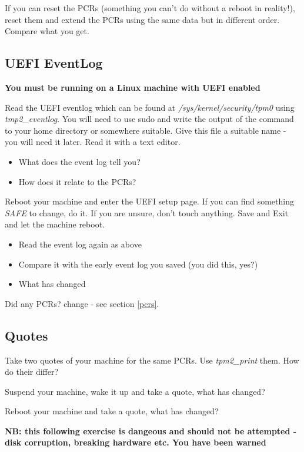 \documentclass[11pt,a4paper]{article}
\begin{document}
If you can reset the PCRs (something you can't do without a reboot in reality!), reset them and extend the PCRs using the same data but in different order. Compare what you get.


\subsection{UEFI EventLog}
\textbf{You must be running on a Linux machine with UEFI enabled}

Read the UEFI eventlog which can be found at \textit{/sys/kernel/security/tpm0} using \textit{tmp2\_eventlog}. You will need to use sudo and write the output of the command to your home directory or somewhere suitable. Give this file a suitable name - you will need it later. Read it with a text editor.

\begin{itemize}
 \item What does the event log tell you?  
 \item How does it relate to the PCRs?
\end{itemize}

Reboot your machine and enter the UEFI setup page. If you can find something \textit{SAFE} to change, do it. If you are unsure, don't touch anything. Save and Exit and let the machine reboot.

\begin{itemize}
 \item Read the event log again as above
 \item Compare it with the early event log you saved (you did this, yes?)
 \item What has changed
\end{itemize}

Did any PCRs? change - see section \ref{pcrs}.

\subsection{Quotes}
Take two quotes of your machine for the same PCRs. Use \textit{tpm2\_print} them. How do their differ?

Suspend your machine, wake it up and take a quote, what has changed?

Reboot your machine and take a quote, what has changed?

\textbf{NB: this following exercise is dangeous and should not be attempted - disk corruption, breaking hardware etc. You have been warned}
\end{document}
